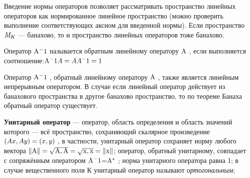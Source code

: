 \documentclass{article}
\begin{document}
Введение нормы операторов позволяет рассматривать пространство
линейных операторов как нормированное линейное пространство (можно
проверить выполнение соответствующих аксиом для введенной нормы). Если
пространство $\mathrm{\it M}_K$ — банахово, то и пространство линейных операторов тоже
банахово.

Оператор $\mathrm{{\Large A}^-1}$ называется обратным линейному оператору $\mathrm{\Large A}$ , если
выполняется соотношение:$\mathrm{{\Large A}^-1} {\Large A}={\Large A}{\Large A}^-1 = 1$

Оператор $\mathrm{{\Large A}^-1}$ , обратный линейному оператору $\mathrm{\Large A}$ , также является линейным
непрерывным оператором. В случае если линейный оператор действует из
банахового пространства в другое банахово пространство, то по теореме
Банаха обратный оператор существует.\par


{\bf Унитарный оператор} — оператор, область определения и область значений
которого — всё пространство, сохраняющий скалярное произведение $\mathrm({\Large A}x, {\Large A}y)=(x,y)$
, в частности, унитарный оператор сохраняет норму
любого вектора $\mathrm{ \|A\|=\sqrt{{\Large A},{\Large A}}=\sqrt{x,x}=\|x\|}$; оператор, обратный
унитарному, совпадает с сопряжённым оператором $\mathrm{{\Large A}^-1}$=$\mathrm{{\Large A}^{*}}$ ; норма
унитарного оператора равна 1; в случае вещественного поля К унитарный
оператор называют {\it ортогональным};
\end{document}
